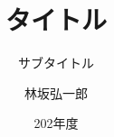 \documentclass[12pt,dvipdfmx]{beamer}
\title{タイトル}
\subtitle{サブタイトル}
\author{林坂弘一郎}
\date{202年度}
\institute[神戸学院大学]{神戸学院大学 経営学部}
\theoremstyle{example}
\begin{document}
\frame{\titlepage}
\section[Outline]{}
\frame{\tableofcontents}
% 
\end{document}
